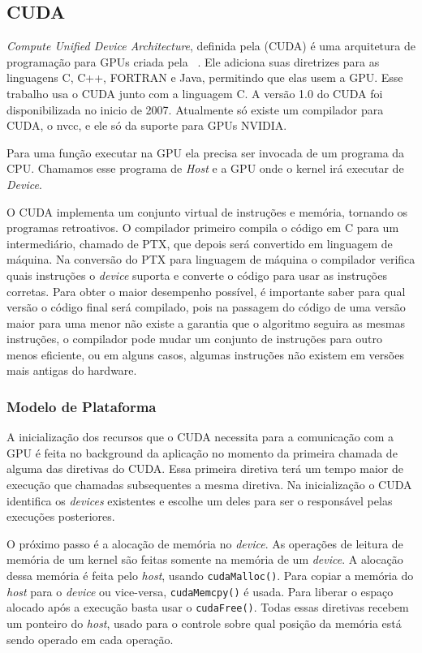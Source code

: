 \subsection{CUDA}
\textit{Compute Unified Device Architecture}, definida pela (CUDA) é uma arquitetura de programação para GPUs criada
pela ~\cite{nvidia2007compute}.
Ele adiciona suas diretrizes para as linguagens C, C++, FORTRAN e Java, permitindo que elas usem a GPU.
Esse trabalho usa o CUDA junto com a linguagem C.
A versão 1.0 do CUDA foi disponibilizada no inicio de 2007. Atualmente só existe um compilador para CUDA, o nvcc,
e ele só da suporte para GPUs NVIDIA.

Para uma função executar na GPU ela precisa ser invocada de um programa da CPU. Chamamos esse programa de \textit{Host}
e a GPU onde o kernel irá executar de \textit{Device}.

O CUDA implementa um conjunto virtual de instruções e memória, tornando os programas retroativos. O compilador
primeiro compila o código em C para um intermediário, chamado de PTX, que depois será convertido em linguagem
de máquina. Na conversão do PTX para linguagem de máquina o compilador verifica quais instruções o \textit{device}
suporta e converte o código para usar as instruções corretas.
Para obter o maior desempenho possível, é importante saber para qual versão o código final será compilado,
pois na passagem do código de uma versão maior para uma menor não existe a garantia que o algoritmo seguira as mesmas instruções,
o compilador pode mudar um conjunto de instruções para outro menos eficiente, ou em alguns casos, algumas instruções não existem em
versões mais antigas do hardware.

\subsubsection{Modelo de Plataforma}
A inicialização dos recursos que o CUDA necessita para a comunicação com a GPU é feita no background da
aplicação no momento da primeira chamada de alguma das diretivas do CUDA. Essa primeira diretiva terá um
tempo maior de execução que chamadas subsequentes a mesma diretiva. Na inicialização o CUDA identifica
os \textit{devices} existentes e escolhe um deles para ser o responsável pelas execuções posteriores.

O próximo passo é a alocação de memória no \textit{device}. As operações de leitura de memória de um kernel são feitas somente
na memória de um \textit{device}. A alocação dessa memória é feita pelo \textit{host}, usando \verb#cudaMalloc()#.
Para copiar a memória do \textit{host} para o \textit{device} ou vice-versa,
\verb#cudaMemcpy()# é usada. Para liberar o espaço alocado após a execução basta usar o \verb#cudaFree()#.
Todas essas diretivas recebem um ponteiro do \textit{host}, usado para o controle sobre qual posição da memória está sendo
operado em cada operação.

